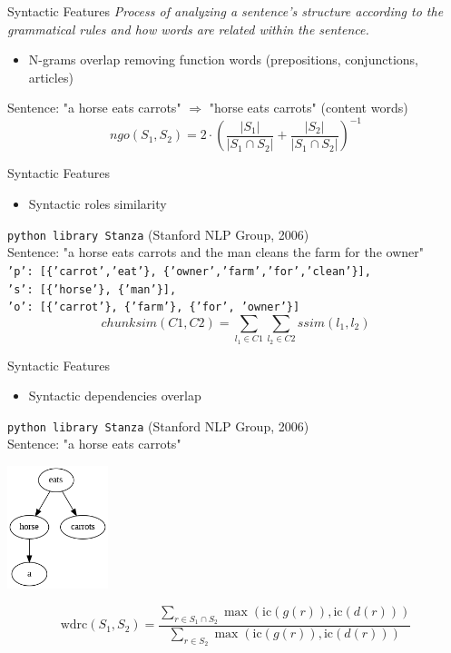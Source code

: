 \begin{frame}{Syntactic Features}
    \textit{Process of analyzing a sentence's structure according to the grammatical rules and how words are related within
    the sentence.}
    \vspace{1cm}
    \begin{itemize}
        \item N-grams overlap removing function words (prepositions, conjunctions, articles)
    \end{itemize}
    \vspace{1cm}
    Sentence: "a horse eats carrots" $\Rightarrow$ "horse eats carrots" (content words)
         \[ ngo(S_1, S_2) = 2 \cdot \left( \frac{|S_1|}{|S_1 \cap S_2|} + \frac{|S_2|}{|S_1 \cap S_2|} \right)^{-1} \]
\end{frame}

\begin{frame}{Syntactic Features}
    \begin{itemize}
        \item Syntactic roles similarity 
    \end{itemize}
    \vspace{0.3cm}
    \texttt{python library Stanza} (Stanford NLP Group, 2006)\\ \vspace{0.1cm}
    Sentence: "a horse eats carrots and the man cleans the farm for the owner" \\ \vspace{0.1cm}
    \texttt{'p': [\{'carrot','eat'\}, \{'owner','farm','for','clean'\}],
    \\ 's': [\{'horse'\}, \{'man'\}], 
    \\ 'o': [\{'carrot'\}, \{'farm'\}, \{'for', 'owner'\}]}
         \[ chunksim(C1, C2) = \sum_{ l_1 \in C1} \sum_{l_2 \in C2}  ssim(l_1, l_2) \]
\end{frame}

\begin{frame}{Syntactic Features}
    \begin{itemize}
        \item Syntactic dependencies overlap
    \end{itemize}
    \vspace{0.2cm}
    \texttt{python library Stanza} (Stanford NLP Group, 2006) \\
    Sentence: "a horse eats carrots" \\
    \begin{center}
        \includegraphics[width=0.22\textwidth]{figures/dependency_tree.png}
    \end{center}
        \[ \text{wdrc}(S_1, S_2) = \frac{\sum_{r \in S_1 \cap S_2} \max(\text{ic}(g(r)), \text{ic}(d(r)))}{\sum_{r \in S_2} 
\max(\text{ic}(g(r)), \text{ic}(d(r)))} \]
\end{frame}


